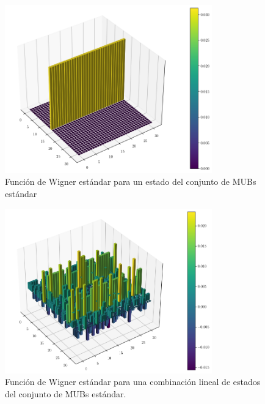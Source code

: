 \documentclass[a4paper]{report}
\begin{document}
  \begin{figure}[ht]
    \centering
    \includegraphics[width=0.8\textwidth]{imgs/wigner-standard-2-5-s1.png}
    \caption{Función de Wigner estándar para un estado del
    conjunto de MUBs estándar}
    \label{fig:wigner-standard-2-5-s1}
  \end{figure}

  \begin{figure}[ht]
    \centering
    \includegraphics[width=0.8\textwidth]{imgs/wigner-standard-2-5-s2.png}
    \caption{Función de Wigner estándar para una combinación
    lineal de estados del conjunto de MUBs estándar.}
    \label{fig:wigner-standard-2-5-s2}
  \end{figure}
\end{document}

